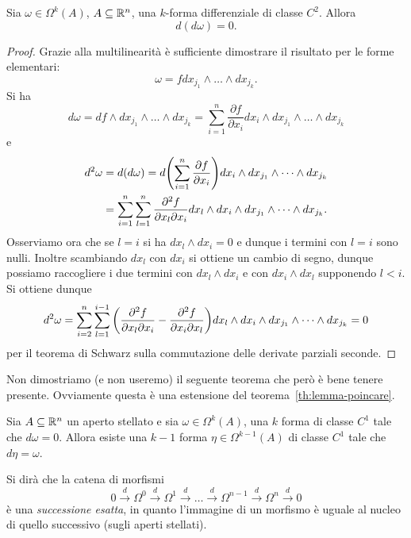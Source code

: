 \begin{theorem}
Sia $\omega \in \Omega^k(A)$, $A\subseteq {\mathbb R}^n$, 
una $k$-forma differenziale di classe $C^2$.
Allora
\[
  d(d\omega) = 0.
\]
\end{theorem}
\begin{proof}
Grazie alla multilinearità è sufficiente dimostrare il risultato 
per le forme elementari:
\[
  \omega = f dx_{j_1}\wedge \dots \wedge dx_{j_k}.
\]
Si ha 
\[
   d\omega 
   = df \wedge dx_{j_1}\wedge \dots \wedge dx_{j_k} 
   = \sum_{i=1}^n \frac{\partial f}{\partial x_i} dx_i \wedge dx_{j_1}\wedge \dots \wedge dx_{j_k}
\]
e
\begin{align*}
  d^2 \omega &= d(d\omega) 
  = d {\left( \sum_{i=1}^n \frac{\partial f}{\partial x_i} \right)} dx_i \wedge dx_{j_1}\wedge \dots \wedge dx_{j_k}\\
  &= \sum_{i=1}^n \sum_{l=1}^n \frac{\partial^2 f}{\partial x_l \partial x_i} dx_l \wedge dx_i \wedge dx_{j_1}\wedge \dots \wedge dx_{j_k}.
\end{align*}
Osserviamo ora che se $l=i$ si ha $dx_l \wedge dx_i = 0$ e dunque i termini con $l=i$ sono nulli.
Inoltre scambiando $dx_l$ con $dx_i$ si ottiene un cambio di segno, 
dunque possiamo raccogliere i due termini con $dx_l\wedge dx_i$ e con $dx_i\wedge dx_l$ 
supponendo $l < i$.
Si ottiene dunque 
\[
  d^2 \omega = \sum_{i=2}^n \sum_{l=1}^{i-1} {\left( \frac{\partial^2 f}{\partial x_l \partial x_i} - \frac{\partial^2 f}{\partial x_i \partial x_l} \right)} 
  dx_l \wedge dx_i \wedge dx_{j_1}\wedge \dots \wedge dx_{j_k}
  = 0
\]
per il teorema di Schwarz sulla commutazione delle derivate parziali seconde.
\end{proof}

Non dimostriamo (e non useremo) il seguente teorema che però è bene tenere presente.
Ovviamente questa è una estensione del teorema~\ref{th:lemma-poincare}.

\begin{theorem}
  Sia $A\subseteq {\mathbb R}^n$ un aperto stellato e
  sia $\omega \in \Omega^k(A)$,
  una $k$ forma di classe $C^1$ tale che $d\omega = 0$.
  Allora esiste 
  una $k-1$ forma $\eta \in \Omega^{k-1}(A)$ di classe $C^1$ tale che $d\eta = \omega$.
\end{theorem}

Si dirà che la catena di morfismi
\[
  0 \stackrel d \longrightarrow
  \Omega^0 \stackrel d \longrightarrow 
  \Omega^1 \stackrel d \longrightarrow \dots
  \stackrel d \longrightarrow \Omega^{n-1}
  \stackrel d \longrightarrow \Omega^n
  \stackrel d \longrightarrow 0
\]
è una \emph{successione esatta}, in quanto l'immagine di un morfismo
è uguale al nucleo di quello successivo (sugli aperti stellati).

